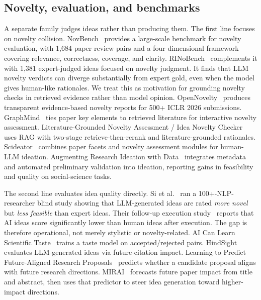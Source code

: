 \documentclass[10pt,a4paper]{article}
\begin{document}
\subsection{Novelty, evaluation, and benchmarks}
\label{subsec:related-novelty}

A separate family judges ideas rather than producing them. The first line focuses on novelty collision. NovBench~\cite{novbench2026} provides a large-scale benchmark for novelty evaluation, with 1{,}684 paper-review pairs and a four-dimensional framework covering relevance, correctness, coverage, and clarity. RINoBench~\cite{schopf2026rinobench} complements it with 1{,}381 expert-judged ideas focused on novelty judgment. It finds that LLM novelty verdicts can diverge substantially from expert gold, even when the model gives human-like rationales. We treat this as motivation for grounding novelty checks in retrieved evidence rather than model opinion. OpenNovelty~\cite{opennovelty2026} produces transparent evidence-based novelty reports for 500+ ICLR 2026 submissions. GraphMind~\cite{graphmind2025} ties paper key elements to retrieved literature for interactive novelty assessment. Literature-Grounded Novelty Assessment / Idea Novelty Checker~\cite{litgrounded2025} uses RAG with two-stage retrieve-then-rerank and literature-grounded rationales. Scideator~\cite{scideator2024} combines paper facets and novelty assessment modules for human-LLM ideation. Augmenting Research Ideation with Data~\cite{augment_ideation2026} integrates metadata and automated preliminary validation into ideation, reporting gains in feasibility and quality on social-science tasks.

The second line evaluates idea quality directly. Si et al.~\cite{si2024llmideas} ran a 100+-NLP-researcher blind study showing that LLM-generated ideas are rated \emph{more novel} but \emph{less feasible} than expert ideas. Their follow-up execution study~\cite{si2026execution} reports that AI ideas score significantly lower than human ideas after execution. The gap is therefore operational, not merely stylistic or novelty-related. AI Can Learn Scientific Taste~\cite{ai_taste2026} trains a taste model on accepted/rejected pairs. HindSight~\cite{hindsight2026} evaluates LLM-generated ideas via future-citation impact. Learning to Predict Future-Aligned Research Proposals~\cite{future_aligned2026} predicts whether a candidate proposal aligns with future research directions. MIRAI~\cite{li2026mirai} forecasts future paper impact from title and abstract, then uses that predictor to steer idea generation toward higher-impact directions.
\end{document}
